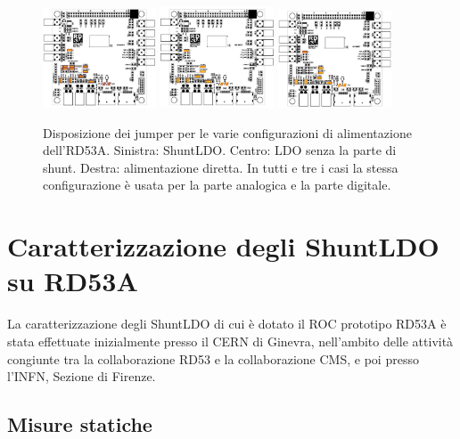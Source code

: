 \begin{figure}[h]
\centering
\includegraphics[width=0.30\textwidth]{Immagini/SLDOmode}
\hfill
\includegraphics[width=0.30\textwidth]{Immagini/LDOmodeDefault}
\hfill
\includegraphics[width=0.30\textwidth]{Immagini/DirectPowering}
\caption{Disposizione dei jumper per le varie configurazioni di alimentazione dell'RD53A. Sinistra: ShuntLDO. Centro: LDO senza la parte di shunt. Destra: alimentazione diretta. In tutti e tre i casi la stessa configurazione \`e usata per la parte analogica e la parte digitale.}
\label{SLDOmodes}
\end{figure}

\section{Caratterizzazione degli ShuntLDO su RD53A}
\label{MisureStaticheRD53A}

La caratterizzazione degli ShuntLDO di cui \`e dotato il ROC prototipo RD53A \`e stata effettuate inizialmente presso il CERN di Ginevra, nell'ambito delle attivit\`a congiunte tra la collaborazione RD53 e la collaborazione CMS, e poi presso l'INFN, Sezione di Firenze.

\subsection{Misure statiche}

